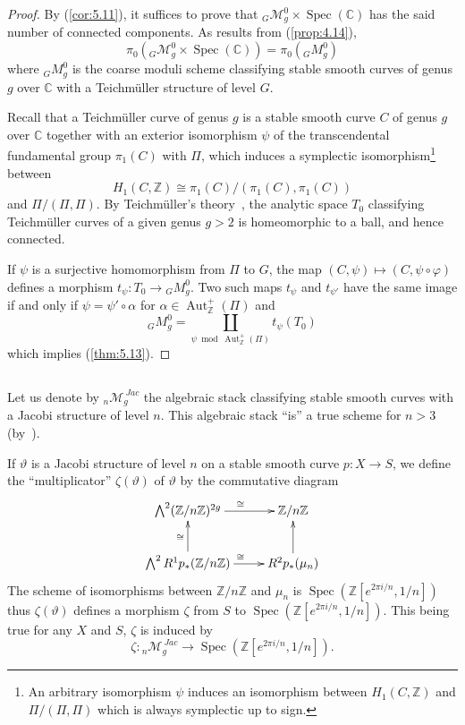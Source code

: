 \documentclass[10pt]{amsart}
\theoremstyle{plain}
\theoremstyle{definition}
\DeclareMathOperator{\Aut}{Aut}
\DeclareMathOperator{\Spec}{Spec}
\begin{document}
\begin{proof}
By (\ref{cor:5.11}), it suffices to prove that $_G\mathscr{M}_g^0 \times \Spec(\mathbb{C})$ has the said number of connected components. As results from (\ref{prop:4.14}),
\[
\pi_0({_G\mathscr{M}_g^0} \times \Spec(\mathbb{C})) = \pi_0({_G M_g^0})
\]
where $_G M_g^0$ is the coarse moduli scheme classifying stable smooth curves of genus $g$ over $\mathbb{C}$ with a Teichm\"uller structure of level $G$.

Recall that a Teichm\"uller curve of genus $g$ is a stable smooth curve $C$ of genus $g$ over $\mathbb{C}$ together with an exterior isomorphism $\psi$ of the transcendental fundamental group $\pi_1(C)$ with $\Pi$, which induces a symplectic isomorphism\footnote{An arbitrary isomorphism $\psi$ induces an isomorphism between $H_1(C, \mathbb{Z})$ and $\Pi/(\Pi, \Pi)$ which is always symplectic up to sign.} between
\[
H_1(C, \mathbb{Z}) \cong \pi_1(C)/(\pi_1(C), \pi_1(C))
\]
and $\Pi/(\Pi, \Pi)$. By Teichm\"uller's theory~\cite{W}, the analytic space $T_0$ classifying Teichm\"uller curves of a given genus $g > 2$ is homeomorphic to a ball, and hence connected.

If $\psi$ is a surjective homomorphism from $\Pi$ to $G$, the map $(C, \psi) \mapsto (C, \psi \circ \varphi)$ defines a morphism $t_\psi: T_0 \to {_G M_g^0}$. Two such maps $t_\psi$ and $t_{\psi'}$ have the same image if and only if $\psi = \psi' \circ \alpha$ for $\alpha \in \Aut_{\mathbb{Z}}^+(\Pi)$ and
\[
{_G M_g^0} = \coprod_{\psi \bmod \Aut_{\mathbb{Z}}^+(\Pi)} t_\psi(T_0)
\]
which implies (\ref{thm:5.13}).
\end{proof}

\subsection*{}

Let us denote by $_n\mathscr{M}_g^{\ Jac}$ the algebraic stack classifying stable smooth curves with a Jacobi structure of level $n$. This algebraic stack ``is'' a true scheme for $n > 3$ (by~\cite{S}).

If $\vartheta$ is a Jacobi structure of level $n$ on a stable smooth curve $p: X \to S$, we define the ``multiplicator'' $\zeta(\vartheta)$ of $\vartheta$ by the commutative diagram
\[
\xymatrix{
\bigwedge^2 (\mathbb{Z}/n\mathbb{Z})^{2g} \ar[r]^\cong & \mathbb{Z}/n\mathbb{Z} \\
\bigwedge^2 R^1 p_*(\mathbb{Z}/n\mathbb{Z}) \ar[r]^\cong \ar[u]^\cong & R^2 p_*(\mu_n) \ar[u]
}
\]
The scheme of isomorphisms between $\mathbb{Z}/n\mathbb{Z}$ and $\mu_n$ is $\Spec(\mathbb{Z}[e^{2\pi i/n}, 1/n])$ thus $\zeta(\vartheta)$ defines a morphism $\zeta$ from $S$ to $\Spec(\mathbb{Z}[e^{2\pi i/n}, 1/n])$. This being true for any $X$ and $S$, $\zeta$ is induced by
\[
\zeta: {_n\mathscr{M}_g^{\ Jac}} \longrightarrow \Spec(\mathbb{Z}[e^{2\pi i/n}, 1/n]).
\]
\end{document}
